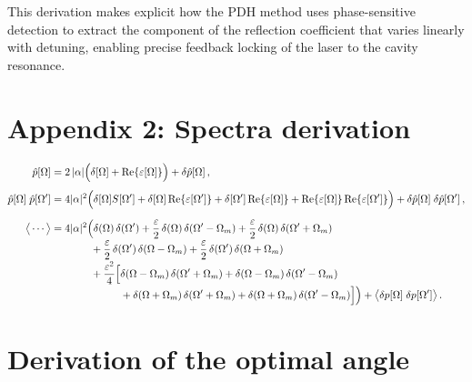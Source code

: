 \bigskip

This derivation makes explicit how the PDH method uses phase-sensitive detection to extract the component of the reflection coefficient that varies linearly with detuning, enabling precise feedback locking of the laser to the cavity resonance.

\chapter*{Appendix 2: Spectra derivation  }\label{app:spectra}

\begin{align}
\hat p[\Omega]
&= 2\,|\alpha| \Big( \delta[\Omega] + \Re\{\varepsilon[\Omega]\} \Big)
  + \delta \hat p[\Omega] \,,
\\[4pt]
\hat p[\Omega]\;\hat p[\Omega']
&= 4|\alpha|^{2}\Big(
      \delta[\Omega]S[\Omega']
    + \delta[\Omega]\Re\{\varepsilon[\Omega']\}
    + \delta[\Omega']\Re\{\varepsilon[\Omega]\}
    + \Re\{\varepsilon[\Omega]\}\Re\{\varepsilon[\Omega']\}
  \Big)
  + \delta \hat p[\Omega]\;\delta \hat p[\Omega'] \,,
\\[6pt]
\big\langle \cdots \big\rangle
&= 4|\alpha|^{2}\Big(
      \delta(\Omega)\,\delta(\Omega')
    + \frac{\varepsilon}{2}\,\delta(\Omega)\,\delta(\Omega'-\Omega_m)
    + \frac{\varepsilon}{2}\,\delta(\Omega)\,\delta(\Omega'+\Omega_m)
\\[-2pt]&\hphantom{= 4|\alpha|^{2}\Big(}
    + \frac{\varepsilon}{2}\,\delta(\Omega')\,\delta(\Omega-\Omega_m)
    + \frac{\varepsilon}{2}\,\delta(\Omega')\,\delta(\Omega+\Omega_m)
\\[-2pt]&\hphantom{= 4|\alpha|^{2}\Big(}
    + \frac{\varepsilon^{2}}{4}\Big[
          \delta(\Omega-\Omega_m)\,\delta(\Omega'+\Omega_m)
        + \delta(\Omega-\Omega_m)\,\delta(\Omega'-\Omega_m)
\\[-2pt]&\hphantom{= 4|\alpha|^{2}\Big(+ \frac{\varepsilon^{2}}{4}\Big[}
        + \delta(\Omega+\Omega_m)\,\delta(\Omega'+\Omega_m)
        + \delta(\Omega+\Omega_m)\,\delta(\Omega'-\Omega_m)
      \Big]
  \Big)
  + \big\langle \delta p[\Omega]\;\delta p[\Omega'] \big\rangle \,.
\end{align}





\chapter*{Derivation of the optimal angle}
